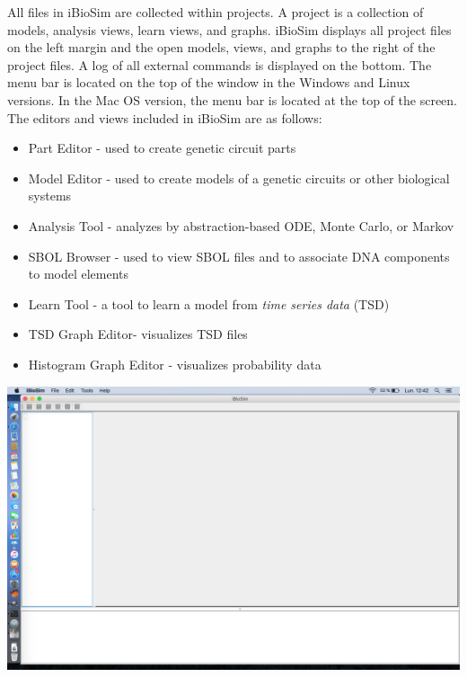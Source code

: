 \documentclass[titlepage,11pt]{article}
\begin{document}
All files in iBioSim are collected within projects. A project is a collection of models, analysis views, learn views, and graphs. iBioSim displays all project files on the left margin and the open models, views, and graphs to the right of the project files. A log of all external commands is displayed on the bottom.  The menu bar is located on the top of the window in the Windows and Linux versions. In the Mac OS version, the menu bar is located at the top of the screen. The editors and views included in iBioSim are as follows: 

\begin{itemize}
\item Part Editor - used to create genetic circuit parts
\item Model Editor - used to create models of a genetic circuits or other biological systems 
\item Analysis Tool - analyzes by abstraction-based ODE, Monte Carlo, or Markov
\item SBOL Browser - used to view SBOL files and to associate DNA components to model elements
\item Learn Tool - a tool to learn a model from \emph{time series data} (TSD)
\item TSD Graph Editor- visualizes TSD files 
\item Histogram Graph Editor - visualizes probability data 
\end{itemize}

\begin{center}
\includegraphics[width=160mm]{screenshots/iBioSim}
\end{center}
\end{document}
